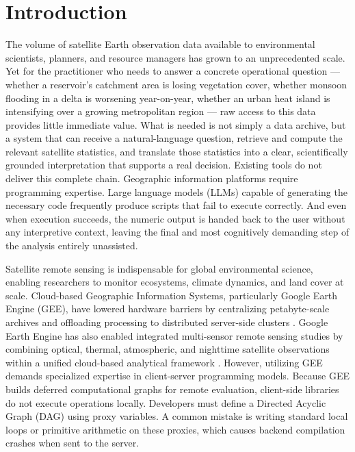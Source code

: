 \documentclass[pdflatex,sn-mathphys-ay]{sn-jnl}
\begin{document}

\maketitle

\section{Introduction}\label{sec:intro}

The volume of satellite Earth observation data available to environmental scientists, planners, and resource managers has grown to an unprecedented scale. Yet for the practitioner who needs to answer a concrete operational question --- whether a reservoir's catchment area is losing vegetation cover, whether monsoon flooding in a delta is worsening year-on-year, whether an urban heat island is intensifying over a growing metropolitan region --- raw access to this data provides little immediate value. What is needed is not simply a data archive, but a system that can receive a natural-language question, retrieve and compute the relevant satellite statistics, and translate those statistics into a clear, scientifically grounded interpretation that supports a real decision. Existing tools do not deliver this complete chain. Geographic information platforms require programming expertise. Large language models (LLMs) capable of generating the necessary code frequently produce scripts that fail to execute correctly. And even when execution succeeds, the numeric output is handed back to the user without any interpretive context, leaving the final and most cognitively demanding step of the analysis entirely unassisted.

Satellite remote sensing is indispensable for global environmental science, enabling researchers to monitor ecosystems, climate dynamics, and land cover at scale. Cloud-based Geographic Information Systems, particularly Google Earth Engine (GEE), have lowered hardware barriers by centralizing petabyte-scale archives and offloading processing to distributed server-side clusters \citep{Gorelick2017, Amani2020}. Google Earth Engine has also enabled integrated multi-sensor remote sensing studies by combining optical, thermal, atmospheric, and nighttime satellite observations within a unified cloud-based analytical framework \citep{Kasana2026}. However, utilizing GEE demands specialized expertise in client-server programming models. Because GEE builds deferred computational graphs for remote evaluation, client-side libraries do not execute operations locally. Developers must define a Directed Acyclic Graph (DAG) using proxy variables. A common mistake is writing standard local loops or primitive arithmetic on these proxies, which causes backend compilation crashes when sent to the server.
\end{document}
